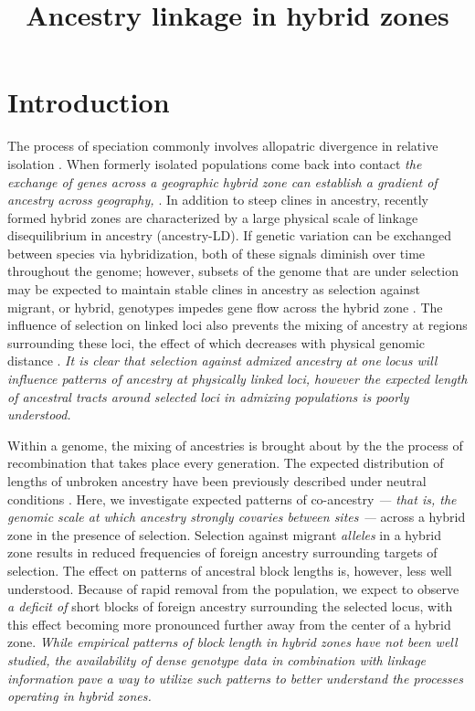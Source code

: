 \documentclass[12pt]{article}
\title{Ancestry linkage in hybrid zones}
\author{}
\date{} %
\newcommand{\alisa}[1]{{\em \color{red} #1}}
\newcommand{\yb}[1]{{\em \color{magenta} #1}}
\begin{document}
\maketitle

\section{Introduction}
The process of speciation commonly involves allopatric divergence in relative isolation \citep{Coyne2004}. When formerly isolated populations come back into contact \yb{the exchange of genes across a geographic hybrid zone can establish a gradient of ancestry across geography, \citep{Barton1985}}. In addition to steep clines in ancestry, recently formed hybrid zones are characterized by a large physical scale of linkage disequilibrium in ancestry (ancestry-LD). If genetic variation can be exchanged between species via hybridization, both of these signals diminish over time throughout the genome; however, subsets of the genome that are under selection may be expected to maintain stable clines in ancestry as selection against migrant, or hybrid, genotypes impedes gene flow across the hybrid zone \citep{Barton1979a}. The influence of selection on linked loci also prevents the mixing of ancestry at regions surrounding these loci, the effect of which decreases with physical genomic distance \citep{Barton1986}. \yb{It is clear that selection against admixed ancestry at one locus will influence patterns of ancestry at physically linked loci, however the expected length of ancestral tracts around selected loci in admixing populations is poorly understood.}


Within a genome, the mixing of ancestries is brought about by the the process of recombination that takes place every generation. The expected distribution of lengths of unbroken ancestry have been previously described under neutral conditions \cite[e.g.][]{Gravel2012,Sedghifar2015}.  
Here, we investigate expected patterns of co-ancestry \yb{ --- that is, the genomic scale at which ancestry strongly covaries between sites --- } across a hybrid zone in the presence of selection. 
Selection against migrant \yb{alleles} in a hybrid zone results in reduced frequencies of foreign ancestry surrounding targets of selection. 
The effect on patterns of ancestral block lengths is, however, less well understood. 
Because of rapid removal from the population, we expect to observe \yb{a deficit of} short blocks of foreign ancestry surrounding the selected locus, with this effect becoming more pronounced further away from the center of a hybrid zone. \alisa{While empirical patterns of block length in hybrid zones have not been well studied, the availability of dense genotype data in combination with linkage information pave a way to utilize such patterns to better understand the processes operating in hybrid zones. }
\end{document}
